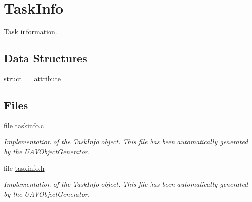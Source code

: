 \hypertarget{group___task_info}{\section{\-Task\-Info}
\label{group___task_info}
}


\-Task information.  


\subsection*{\-Data \-Structures}
\begin{DoxyCompactItemize}
\item 
struct \hyperlink{struct____attribute____}{\-\_\-\-\_\-attribute\-\_\-\-\_\-}
\end{DoxyCompactItemize}
\subsection*{\-Files}
\begin{DoxyCompactItemize}
\item 
file \hyperlink{taskinfo_8c}{taskinfo.\-c}
\begin{DoxyCompactList}\small\item\em \-Implementation of the \-Task\-Info object. \-This file has been automatically generated by the \-U\-A\-V\-Object\-Generator. \end{DoxyCompactList}\item 
file \hyperlink{taskinfo_8h}{taskinfo.\-h}
\begin{DoxyCompactList}\small\item\em \-Implementation of the \-Task\-Info object. \-This file has been automatically generated by the \-U\-A\-V\-Object\-Generator. \end{DoxyCompactList}\end{DoxyCompactItemize}
